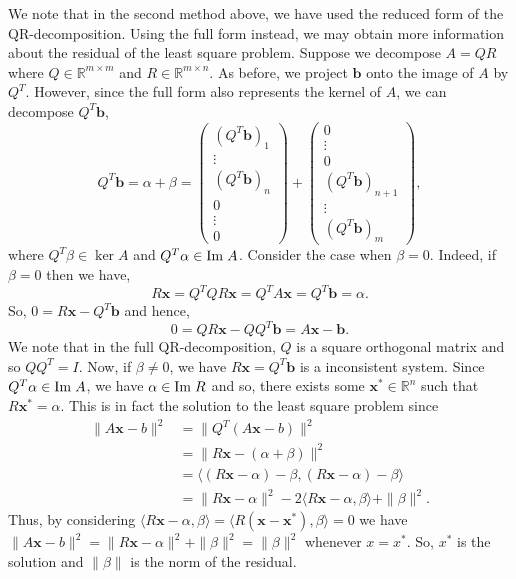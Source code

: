 \documentclass[
]{article}
\theoremstyle{definition}
\theoremstyle{definition}
\begin{document}
We note that in the second method above, we have used the reduced form
of the QR-decomposition. Using the full form instead, we may obtain more
information about the residual of the least square problem. Suppose we
decompose \(A = QR\) where \(Q \in \mathbb{R}^{m \times m}\) and
\(R \in \mathbb{R}^{m \times n}\). As before, we project \(\mathbf{b}\)
onto the image of \(A\) by \(Q^T\). However, since the full form also
represents the kernel of \(A\), we can decompose \(Q^T\mathbf{b}\),
\[Q^T \mathbf{b} = \alpha + \beta =  
\begin{pmatrix}
  (Q^T \mathbf{b})_1 \\ \vdots\\ (Q^T \mathbf{b})_n\\ 0\\ \vdots\\ 0
\end{pmatrix} + 
\begin{pmatrix}
  0\\ \vdots\\ 0\\ (Q^T \mathbf{b})_{n + 1} \\ \vdots\\ (Q^T \mathbf{b})_m
\end{pmatrix},\] where \(Q^T\beta \in \ker A\) and
\(Q^T\alpha \in \text{Im}\hspace{1mm} A\). Consider the case when
\(\beta = 0\). Indeed, if \(\beta = 0\) then we have,
\[R\mathbf{x} = Q^TQR \mathbf{x} = Q^TA\mathbf{x} = Q^T\mathbf{b} = \alpha.\]
So, \(0 = R\mathbf{x} - Q^T\mathbf{b}\) and hence,
\[0 = QR\mathbf{x} - QQ^T\mathbf{b} = A\mathbf{x} - \mathbf{b}.\] We
note that in the full QR-decomposition, \(Q\) is a square orthogonal
matrix and so \(Q Q^T = I\). Now, if \(\beta \neq 0\), we have
\(R\mathbf{x} = Q^T\mathbf{b}\) is a inconsistent system. Since
\(Q^T\alpha \in \text{Im}\hspace{1mm} A\), we have
\(\alpha \in \text{Im}\hspace{1mm} R\) and so, there exists some
\(\mathbf{x}^* \in \mathbb{R}^n\) such that \(R\mathbf{x}^* = \alpha\).
This is in fact the solution to the least square problem since
\[\begin{split}
  \|A\mathbf{x} - b\|^2 & = \|Q^T(A \mathbf{x} - b)\|^2\\
    & = \|R\mathbf{x} - (\alpha + \beta)\|^2\\
    & = \langle (R\mathbf{x} - \alpha) - \beta, (R\mathbf{x} - \alpha) - \beta \rangle\\
    & = \|R\mathbf{x} - \alpha\|^2 - 2\langle R\mathbf{x} - \alpha, \beta \rangle + \|\beta\|^2.
\end{split}\] Thus, by considering
\(\langle R\mathbf{x} - \alpha, \beta \rangle = \langle R(\mathbf{x} - \mathbf{x}^*), \beta \rangle = 0\)
we have
\(\|A\mathbf{x} - b\|^2 = \|R\mathbf{x} - \alpha\|^2 + \|\beta\|^2 = \|\beta\|^2\)
whenever \(x = x^*\). So, \(x^*\) is the solution and \(\|\beta\|\) is
the norm of the residual.
\end{document}
